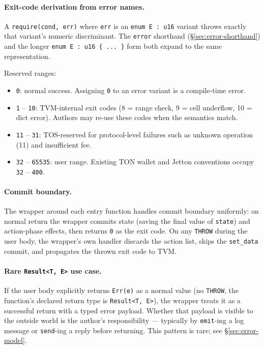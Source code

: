 \documentclass[12pt,oneside]{article}
\begin{document}
\paragraph{Exit-code derivation from error names.}
A \verb|require(cond, err)| where \verb|err| is an
\verb|enum E : u16| variant throws exactly that variant's numeric
discriminant. The \verb|error| shorthand (\S\ref{sec:error-shorthand})
and the longer \verb|enum E : u16 { ... }| form both expand to the
same representation.

Reserved ranges:

\begin{itemize}
\item \verb|0|: normal success. Assigning \verb|0| to an error variant
is a compile-time error.
\item \verb|1| -- \verb|10|: TVM-internal exit codes (8 = range check, 9
= cell underflow, 10 = dict error). Authors may re-use these codes
when the semantics match.
\item \verb|11| -- \verb|31|: TOS-reserved for protocol-level failures
such as unknown operation (11) and insufficient fee.
\item \verb|32| -- \verb|65535|: user range. Existing TON wallet and
Jetton conventions occupy \verb|32| -- \verb|400|.
\end{itemize}

\paragraph{Commit boundary.}
The wrapper around each entry function handles commit boundary
uniformly: on normal return the wrapper commits state (saving the
final value of \verb|state|) and action-phase effects, then returns
\verb|0| as the exit code. On any \verb|THROW| during the user body,
the wrapper's own handler discards the action list, skips the
\verb|set_data| commit, and propagates the thrown exit code to TVM.

\paragraph{Rare \texttt{Result<T, E>} use case.}
If the user body explicitly returns \verb|Err(e)| as a normal value
(no \verb|THROW|, the function's declared return type is
\verb|Result<T, E>|), the wrapper treats it as a successful return
with a typed error payload. Whether that payload is visible to the
outside world is the author's responsibility --- typically by
\verb|emit|-ing a log message or \verb|send|-ing a reply before
returning. This pattern is rare; see \S\ref{sec:error-model}.
\end{document}
